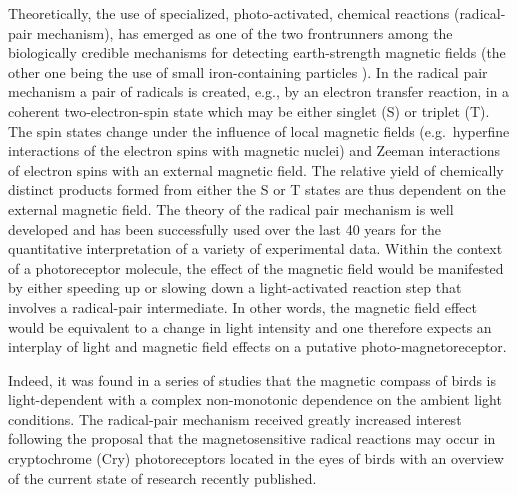 \documentclass[twoside,twocolumn,9pt]{article}
\begin{document}
Theoretically, the use of specialized, photo-activated, chemical reactions (radical-pair mechanism), has emerged as one of the two
frontrunners among the biologically credible mechanisms for detecting earth-strength magnetic fields (the other one being the use of
small iron-containing particles \cite{Kirschvink1981}). In the radical pair mechanism \cite{Schulten1978} a pair of radicals is
created, e.g., by an electron transfer reaction, in a coherent two-electron-spin state which may be either singlet (S) or triplet
(T). The spin states change under the influence of local magnetic fields (e.g.\ hyperfine interactions of the electron spins with
magnetic nuclei) and Zeeman interactions of electron spins with an external magnetic field. The relative yield of chemically
distinct products formed from either the S or T states are thus dependent on the external magnetic field. The theory of the radical
pair mechanism is well developed and has been successfully used over the last 40 years for the quantitative interpretation of a
variety of experimental data. Within the context of a photoreceptor molecule, the effect of the magnetic field would be manifested
by either speeding up or slowing down a light-activated reaction step that involves a radical-pair intermediate. In other words, the
magnetic field effect would be equivalent to a change in light intensity and one therefore expects an interplay of light and
magnetic field effects on a putative photo-magnetoreceptor.

Indeed, it was found in a series of studies that the magnetic compass of birds is light-dependent with a complex non-monotonic
dependence on the ambient light conditions. \cite{Johnsen2007, Wiltschko2016, Wiltschko2008} The radical-pair mechanism received
greatly increased interest following the proposal that the magnetosensitive radical reactions may occur in cryptochrome (Cry)
photoreceptors located in the eyes of birds \cite{Ritz2000} with an overview of the current state of research recently published.
\cite{Hore2016}
\end{document}
